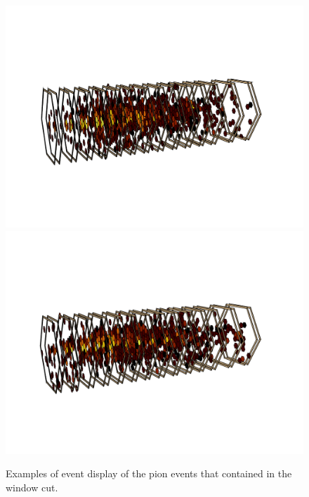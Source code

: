 \begin{figure}[p]
    \begin{center}  
    \includegraphics[width=1.0\textwidth]{Fig/fig_HGCAL/EvDisplay3D-pion-100GeV-Junev1sim-event102}\\
    \includegraphics[width=1.0\textwidth]{Fig/fig_HGCAL/EvDisplay3D-pion-100GeV-Junev1sim-event388}\\
    \caption{Examples of event display of the pion events that contained in the window cut.}
    \label{fig:EvDisplay-pion-window}
    \end{center}
\end{figure}

